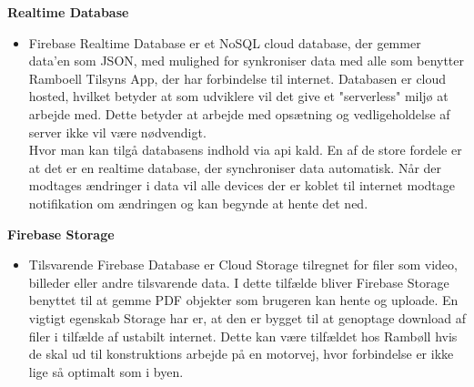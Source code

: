 \textbf{Realtime Database\cite{FirebaseRealtimeDB}}
\begin{itemize}[-]
	\itemsep 0.3em 
	\item[]  Firebase Realtime Database er et NoSQL cloud database, der gemmer data'en som JSON\cite{JSON}, med mulighed for synkroniser data med alle som benytter Ramboell Tilsyns App, der har forbindelse til internet. Databasen er cloud hosted, hvilket betyder at som udviklere vil det give et "serverless" miljø at arbejde med. Dette betyder at arbejde med opsætning og vedligeholdelse af server ikke vil være nødvendigt. \\ Hvor man kan tilgå databasens indhold via api kald. 
	En af de store fordele er at det er en realtime database, der synchroniser data automatisk. Når der modtages ændringer i data vil alle devices der er koblet til internet modtage notifikation om ændringen og kan begynde at hente det ned. 
\end{itemize}

\textbf{Firebase Storage\cite{FirebaseStorage}}
\begin{itemize}[-]
	\itemsep 0.3em 
	\item[] Tilsvarende Firebase Database er Cloud Storage tilregnet for filer som video, billeder eller andre tilsvarende data. I dette tilfælde bliver Firebase Storage benyttet til at gemme PDF objekter som brugeren kan hente og uploade. En vigtigt egenskab Storage har er, at den er bygget til at genoptage download af filer i tilfælde af ustabilt internet. Dette kan være tilfældet hos Rambøll hvis de skal ud til konstruktions arbejde på en motorvej, hvor forbindelse er ikke lige så optimalt som i byen. \\
\end{itemize}
\clearpage

